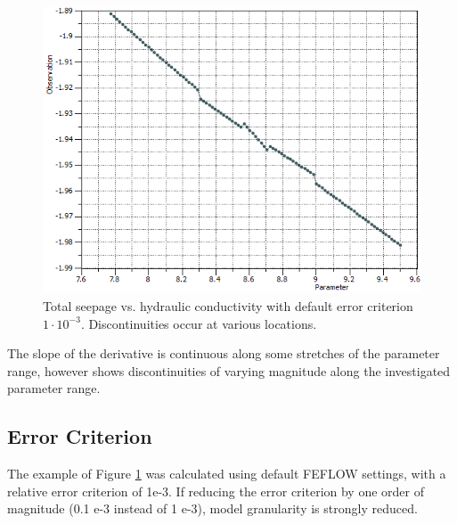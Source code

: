 \begin{figure}
	\center
	\includegraphics[width=\columnwidth]{figures/stabil-con-body-e1-3_100it.png}
\caption{Total seepage vs. hydraulic conductivity with default error criterion $1 \cdot 10^{-3}$. Discontinuities occur at various locations.}
\label{fig:fepest:stabil-con-body-e1-3_100it}
\end{figure}

The slope of the derivative is continuous along some stretches of the parameter range, however shows discontinuities of varying magnitude along the investigated parameter range. 

\subsection{Error Criterion}
The example of Figure \ref{fig:fepest:stabil-con-body-e1-3_100it} was calculated using default FEFLOW settings, with a relative error criterion of 1e-3. If reducing the error criterion by one order of magnitude (0.1 e-3 instead of 1 e-3), model granularity is strongly reduced.

